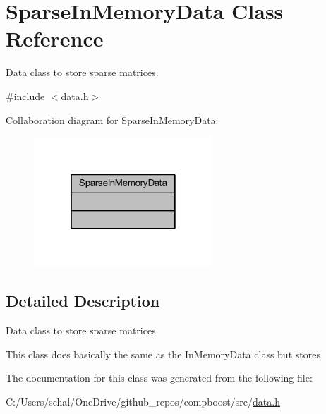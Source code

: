 \hypertarget{class_sparse_in_memory_data}{}\section{Sparse\+In\+Memory\+Data Class Reference}
\label{class_sparse_in_memory_data}


Data class to store sparse matrices.  




{\ttfamily \#include $<$data.\+h$>$}



Collaboration diagram for Sparse\+In\+Memory\+Data\+:\nopagebreak
\begin{figure}[H]
\begin{center}
\leavevmode
\includegraphics[width=190pt]{class_sparse_in_memory_data__coll__graph}
\end{center}
\end{figure}


\subsection{Detailed Description}
Data class to store sparse matrices. 

This class does basically the same as the {\ttfamily In\+Memory\+Data} class but stores 

The documentation for this class was generated from the following file\+:\begin{DoxyCompactItemize}
\item 
C\+:/\+Users/schal/\+One\+Drive/github\+\_\+repos/compboost/src/\mbox{\hyperlink{data_8h}{data.\+h}}\end{DoxyCompactItemize}
